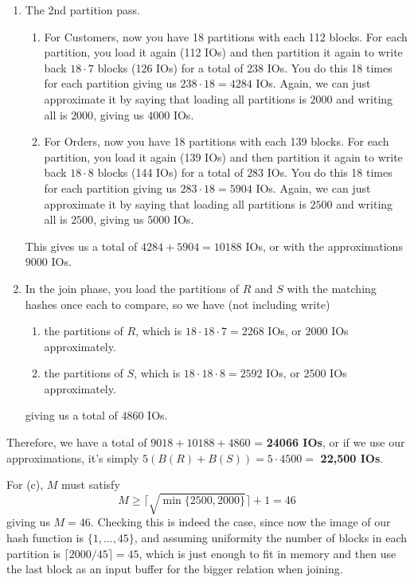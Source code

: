 \documentclass{article}
\begin{document}
\begin{example}
\begin{enumerate}
        \item The 2nd partition pass. 
          \begin{enumerate}
            \item For Customers, now you have 18 partitions with each 112 blocks. For each partition, you load it again (112 IOs) and then partition it again to write back $18 \cdot 7$ blocks (126 IOs) for a total of $238$ IOs. You do this 18 times for each partition giving us $238 \cdot 18 = 4284$ IOs. Again, we can just approximate it by saying that loading all partitions is $2000$ and writing all is $2000$, giving us $4000$ IOs. 
            \item For Orders, now you have 18 partitions with each 139 blocks. For each partition, you load it again (139 IOs) and then partition it again to write back $18 \cdot 8$ blocks (144 IOs) for a total of $283$ IOs. You do this 18 times for each partition giving us $283 \cdot 18 = 5904$ IOs. Again, we can just approximate it by saying that loading all partitions is $2500$  and writing all is $2500$, giving us $5000$ IOs. 
          \end{enumerate}
          This gives us a total of $4284 + 5904 = 10188$ IOs, or with the approximations $9000$ IOs. 

        \item In the join phase, you load the partitions of $R$ and $S$ with the matching hashes once each to compare, so we have (not including write)  
          \begin{enumerate}
            \item the partitions of $R$, which is $18 \cdot 18 \cdot 7 = 2268$ IOs, or $2000$ IOs approximately.  
            \item the partitions of $S$, which is $18 \cdot 18 \cdot 8 = 2592$ IOs, or $2500$ IOs approximately.  
          \end{enumerate}
          giving us a total of $4860$ IOs. 
      \end{enumerate}
      Therefore, we have a total of $9018 + 10188 + 4860$ = \textbf{24066 IOs}, or if we use our approximations, it's simply $5 (B(R) + B(S)) = 5 \cdot 4500 =$ \textbf{22,500 IOs}. 

      For (c), $M$ must satisfy 
      \begin{equation}
        M \geq \lceil \sqrt{\min\{2500, 2000\}} \rceil + 1 = 46
      \end{equation} 
      giving us $M = 46$. Checking this is indeed the case, since now the image of our hash function is $\{1, \ldots, 45\}$, and assuming uniformity the number of blocks in each partition is $\lceil 2000 / 45 \rceil = 45$, which is just enough to fit in memory and then use the last block as an input buffer for the bigger relation when joining. 
    \end{example}
\end{document}
